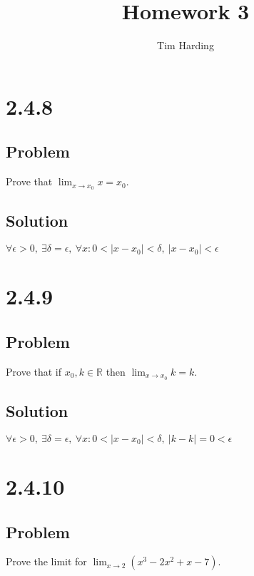 \documentclass[12pt]{article}
\title{Homework 3}
\author{Tim Harding}
\newcommand{\round}[1]{\left(       #1 \right)      }
\newcommand{\abs}  [1]{\left|       #1 \right|      }
\newcommand{\R}    [0]{\mathbb{R}                   }
\begin{document}
\maketitle

\section*{2.4.8}

\subsection*{Problem}

Prove that $\lim_{x \to x_0} x = x_0$.

\subsection*{Solution}

$\forall \epsilon > 0,\ \exists \delta = \epsilon,\ \forall x : 0 < \abs{x - x_0} < \delta,\ \abs{x - x_0} < \epsilon$



\section*{2.4.9}

\subsection*{Problem}

Prove that if $x_0, k \in \R$ then $\lim_{x \to x_0} k = k$.

\subsection*{Solution}

$\forall \epsilon > 0,\ \exists \delta = \epsilon,\ \forall x : 0 < \abs{x - x_0} < \delta,\ \abs{k - k} = 0 < \epsilon$



\section*{2.4.10}

\subsection*{Problem}

Prove the limit for $\lim_{x \to 2} \round{x^3 - 2x^2 + x - 7}$.
\end{document}
